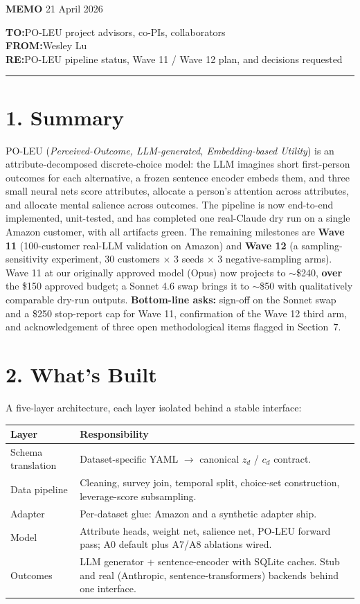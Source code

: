 \documentclass[11pt]{article}
\title{}
\author{}
\date{}
\begin{document}
\textbf{MEMO} \hfill 21 April 2026

\textbf{TO:}\quad PO-LEU project advisors, co-PIs, collaborators \\
\textbf{FROM:}\quad Wesley Lu \\
\textbf{RE:}\quad PO-LEU pipeline status, Wave 11 / Wave 12 plan, and decisions requested

\vspace{4pt}
\hrule
\vspace{6pt}

\section*{1. Summary}

PO-LEU (\textit{Perceived-Outcome, LLM-generated, Embedding-based Utility}) is an attribute-decomposed discrete-choice model: the LLM imagines short first-person outcomes for each alternative, a frozen sentence encoder embeds them, and three small neural nets score attributes, allocate a person's attention across attributes, and allocate mental salience across outcomes. The pipeline is now end-to-end implemented, unit-tested, and has completed one real-Claude dry run on a single Amazon customer, with all artifacts green. The remaining milestones are \textbf{Wave 11} (100-customer real-LLM validation on Amazon) and \textbf{Wave 12} (a sampling-sensitivity experiment, 30 customers $\times$ 3 seeds $\times$ 3 negative-sampling arms). Wave 11 at our originally approved model (Opus) now projects to $\sim$\$240, \textbf{over} the \$150 approved budget; a Sonnet 4.6 swap brings it to $\sim$\$50 with qualitatively comparable dry-run outputs. \textbf{Bottom-line asks:} sign-off on the Sonnet swap and a \$250 stop-report cap for Wave 11, confirmation of the Wave 12 third arm, and acknowledgement of three open methodological items flagged in Section~7.

\section*{2. What's Built}

A five-layer architecture, each layer isolated behind a stable interface:

\begin{longtable}{l p{}}
\toprule
Layer & Responsibility \\
\midrule
Schema translation & Dataset-specific YAML $\to$ canonical $z_d$ / $c_d$ contract. \\
Data pipeline & Cleaning, survey join, temporal split, choice-set construction, leverage-score subsampling. \\
Adapter & Per-dataset glue: Amazon and a synthetic adapter ship. \\
Model & Attribute heads, weight net, salience net, PO-LEU forward pass; A0 default plus A7/A8 ablations wired. \\
Outcomes & LLM generator + sentence-encoder with SQLite caches. Stub and real (Anthropic, sentence-transformers) backends behind one interface. \\
\bottomrule
\end{longtable}
\end{document}
